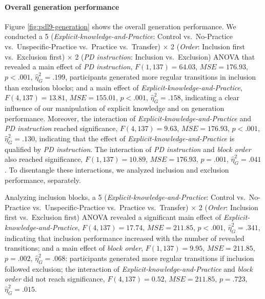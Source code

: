 \documentclass[man]{apa6}
\theoremstyle{definition}
\theoremstyle{definition}
\theoremstyle{definition}
\theoremstyle{remark}
\begin{document}
\paragraph{Overall generation
performance}\label{overall-generation-performance}

Figure \ref{fig:pdl9-generation} shows the overall generation
performance. We conducted a 5 (\emph{Explicit-knowledge-and-Practice}:
Control vs.~No-Practice vs.~Unspecific-Practice vs.~Practice
vs.~Transfer) \(\times\) 2 (\emph{Order}: Inclusion first vs.~Exclusion
first) \(\times\) 2 (\emph{PD instruction}: Inclusion vs.~Exclusion)
ANOVA that revealed a main effect of \emph{PD instruction},
\(F(1, 137) = 64.03\), \(\mathit{MSE} = 176.93\), \(p < .001\),
\(\hat{\eta}^2_G = .199\), participants generated more regular
transitions in inclusion than exclusion blocks; and a main effect of
\emph{Explicit-knowledge-and-Practice}, \(F(4, 137) = 13.81\),
\(\mathit{MSE} = 155.01\), \(p < .001\), \(\hat{\eta}^2_G = .158\),
indicating a clear influence of our manipulation of explicit knowledge
and on generation performance. Moreover, the interaction of
\emph{Explicit-knowledge-and-Practice} and \emph{PD instruction} reached
significance, \(F(4, 137) = 9.63\), \(\mathit{MSE} = 176.93\),
\(p < .001\), \(\hat{\eta}^2_G = .130\), indicating that the effect of
\emph{Explicit-knowledge-and-Practice} is qualified by \emph{PD
instruction}. The interaction of \emph{PD instruction} and \emph{block
order} also reached significance, \(F(1, 137) = 10.89\),
\(\mathit{MSE} = 176.93\), \(p = .001\), \(\hat{\eta}^2_G = .041\). To
disentangle these interactions, we analyzed inclusion and exclusion
performance, separately.

Analyzing inclusion blocks, a 5 (\emph{Explicit-knowledge-and-Practice}:
Control vs.~No-Practice vs.~Unspecific-Practice vs.~Practice
vs.~Transfer) \(\times\) 2 (\emph{Order}: Inclusion first vs.~Exclusion
first) ANOVA revealed a significant main effect of
\emph{Explicit-knowledge-and-Practice}, \(F(4, 137) = 17.74\),
\(\mathit{MSE} = 211.85\), \(p < .001\), \(\hat{\eta}^2_G = .341\),
indicating that inclusion performance increased with the number of
revealed transitions; and a main effect of \emph{block order},
\(F(1, 137) = 9.95\), \(\mathit{MSE} = 211.85\), \(p = .002\),
\(\hat{\eta}^2_G = .068\): participants generated more regular
transitions if inclusion followed exclusion; the interaction of
\emph{Explicit-knowledge-and-Practice} and \emph{block order} did not
reach significance, \(F(4, 137) = 0.52\), \(\mathit{MSE} = 211.85\),
\(p = .723\), \(\hat{\eta}^2_G = .015\).
\end{document}
